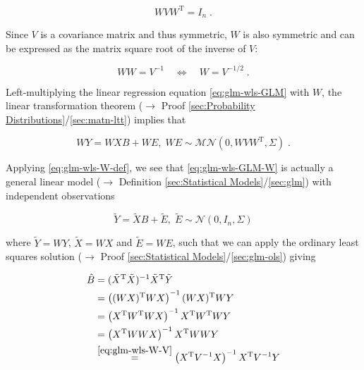 \documentclass[a4paper,12pt,twoside]{book}
\begin{document}
\begin{equation} \label{eq:glm-wls-W-def}
W V W^\mathrm{T} = I_n \; .
\end{equation}

Since $V$ is a covariance matrix and thus symmetric, $W$ is also symmetric and can be expressed as the matrix square root of the inverse of $V$:

\begin{equation} \label{eq:glm-wls-W-V}
W W = V^{-1} \quad \Leftrightarrow \quad W = V^{-1/2} \; .
\end{equation}

Left-multiplying the linear regression equation \eqref{eq:glm-wls-GLM} with $W$, the linear transformation theorem ($\rightarrow$ Proof \ref{sec:Probability Distributions}/\ref{sec:matn-ltt}) implies that

\begin{equation} \label{eq:glm-wls-GLM-W}
WY = WXB + WE, \; WE \sim \mathcal{MN}(0, W V W^\mathrm{T}, \Sigma) \; .
\end{equation}

Applying \eqref{eq:glm-wls-W-def}, we see that \eqref{eq:glm-wls-GLM-W} is actually a general linear model ($\rightarrow$ Definition \ref{sec:Statistical Models}/\ref{sec:glm}) with independent observations

\begin{equation} \label{eq:glm-wls-GLM-W-dev}
\tilde{Y} = \tilde{X}B + \tilde{E}, \; \tilde{E} \sim \mathcal{N}(0, I_n, \Sigma)
\end{equation}

where $\tilde{Y} = WY$, $\tilde{X} = WX$ and $\tilde{E} = WE$, such that we can apply the ordinary least squares solution ($\rightarrow$ Proof \ref{sec:Statistical Models}/\ref{sec:glm-ols}) giving

\begin{equation} \label{eq:glm-wls-WLS-qed}
\begin{split}
\hat{B} &= (\tilde{X}^\mathrm{T} \tilde{X})^{-1} \tilde{X}^\mathrm{T} \tilde{Y} \\
&= \left( (WX)^\mathrm{T} WX \right)^{-1} (WX)^\mathrm{T} WY \\
&= \left( X^\mathrm{T} W^\mathrm{T} W X \right)^{-1} X^\mathrm{T} W^\mathrm{T} W Y \\
&= \left( X^\mathrm{T} W W X \right)^{-1} X^\mathrm{T} W W Y \\
&\overset{\eqref{eq:glm-wls-W-V}}{=} \left( X^\mathrm{T} V^{-1} X \right)^{-1} X^\mathrm{T} V^{-1} Y
\end{split}
\end{equation}
\end{document}
